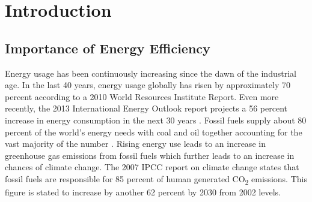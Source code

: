 %
%

\chapter{Introduction}\label{ch:intro} %



\section{Importance of Energy Efficiency} \label{sec:motivation}

Energy usage has been continuously increasing since the dawn of the industrial age. In the last 40 years, energy usage globally has risen by approximately 70 percent according to a 2010 World Resources Institute Report. Even more recently, the 2013 International Energy Outlook report projects a 56 percent increase in energy consumption in the next 30 years \cite{ieo2013}. Fossil fuels supply about 80 percent of the world's energy needs with coal and oil together accounting for the vast majority of the number \cite{ipcc}. Rising energy use leads to an increase in greenhouse gas emissions from fossil fuels which further leads to an increase in chances of climate change. The 2007 IPCC report on climate change states that fossil fuels are responsible for 85 percent of human generated CO\textsubscript{2} emissions. This figure is stated to increase by another 62 percent by 2030 from 2002 levels.

